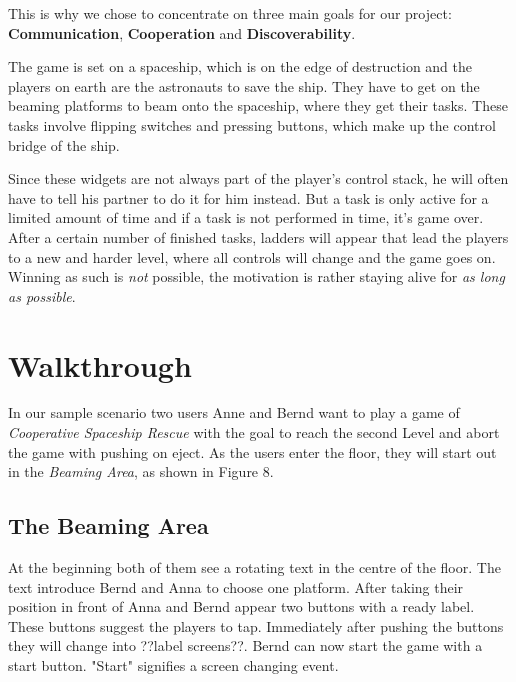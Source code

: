 \documentclass{sigchi}
\begin{document}
This is why we chose to concentrate on three main goals for our project: \textbf{Communication}, \textbf{Cooperation} and \textbf{Discoverability}.



\pagebreak

The game is set on a spaceship, which is on the edge of destruction and the players on earth are the astronauts to save the ship. They have to get on the beaming platforms to beam onto the spaceship, where they get their tasks. These tasks involve flipping switches and pressing buttons, which make up the control bridge of the ship. 

Since these widgets are not always part of the player's control stack, he will often have to tell his partner to do it for him instead. But a task is only active for a limited amount of time and if a task is not performed in time, it's game over. \newline
After a certain number of finished tasks, ladders will appear that lead the players to a new and harder level, where all controls will change and the game goes on. Winning as such is \textit{not} possible, the motivation is rather staying alive for  \textit{as long as possible}.
\section{Walkthrough}
\vspace{1mm}
In our sample scenario two users Anne and Bernd want to play a game of \textit{Cooperative Spaceship Rescue} with the goal to reach the second Level and abort the game with pushing on eject. As the users enter the floor, they will start out in the \textit{Beaming Area}, as shown in Figure 8.

\subsection{The Beaming Area}
\vspace{3mm}
At the beginning both of them see a rotating text in the centre of the floor. The text introduce Bernd and Anna to choose one platform. After taking their position in front of Anna and Bernd appear two buttons with a ready label. These buttons suggest the players to tap. Immediately after pushing the buttons they will change into ??label screens??. Bernd can now start the game with a start button. "Start" signifies a screen changing event.
\end{document}
